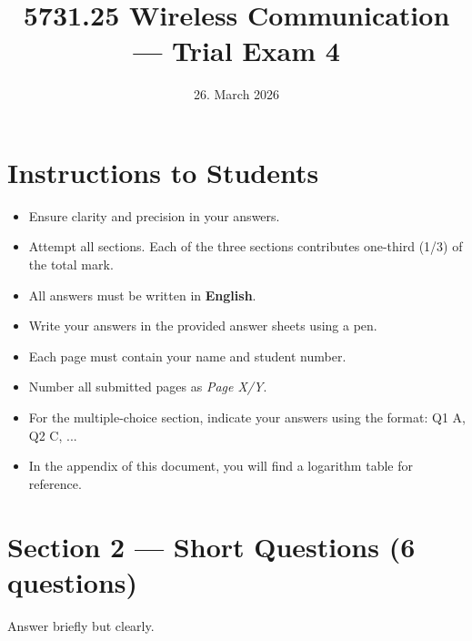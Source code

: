 \documentclass[11pt,a4paper]{article}
\begin{document}
\pagestyle{fancy}
\fancyhf{}
\renewcommand{\headrulewidth}{0pt}
\renewcommand{\footrulewidth}{0pt}
\fancyfoot[R]{\thepage/\pageref{LastPage}}
\fancypagestyle{plain}{
    \fancyhf{}
    \fancyfoot[R]{\thepage/\pageref{LastPage}}
    \renewcommand{\headrulewidth}{0pt}
    \renewcommand{\footrulewidth}{0pt}
}

\title{5731.25 Wireless Communication --- Trial Exam 4}
\date{26. March 2026}
\maketitle

\section*{Instructions to Students}
\begin{itemize}
    \item Ensure clarity and precision in your answers.
    \item Attempt all sections. Each of the three sections contributes one-third (1/3) of the total mark.
    \item All answers must be written in \textbf{English}.
    \item Write your answers in the provided answer sheets using a pen.
    \item Each page must contain your name and student number.
    \item Number all submitted pages as \textit{Page X/Y}.
    \item For the multiple-choice section, indicate your answers using the format: Q1 A, Q2 C, ...
    \item In the appendix of this document, you will find a logarithm table for reference.
\end{itemize}

\newpage

\newpage

\section*{Section 2 --- Short Questions (6 questions)}
Answer briefly but clearly.
\end{document}
